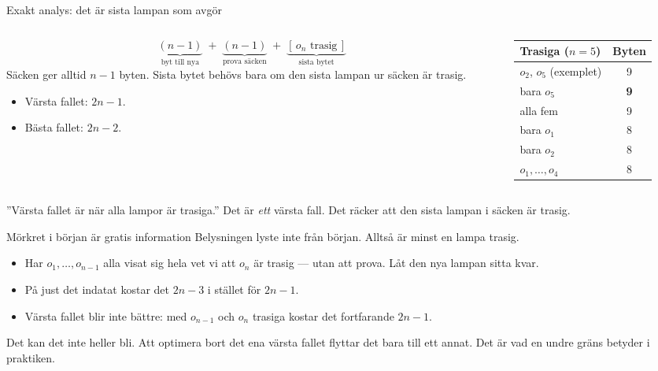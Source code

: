 \begin{frame}{Exakt analys: det är sista lampan som avgör}
\begin{columns}[T]
\begin{column}{0.5\textwidth}
\small
\[
  \underbrace{(n-1)}_{\text{byt till nya}}\;+\;\underbrace{(n-1)}_{\text{prova säcken}}
  \;+\;\underbrace{[\,o_n\text{ trasig}\,]}_{\text{sista bytet}}
\]
Säcken ger alltid $n-1$ byten. Sista bytet behövs bara om den sista lampan ur säcken är trasig.
\begin{itemize}\setlength{\itemsep}{2pt}
  \item Värsta fallet: $2n-1$.
  \item Bästa fallet: $2n-2$.
\end{itemize}
\end{column}
\begin{column}{0.47\textwidth}
\centering
\footnotesize
\renewcommand{\arraystretch}{1.1}
\begin{tabular}{@{}lc@{}}
\toprule
Trasiga ($n=5$) & Byten\\
\midrule
$o_2$, $o_5$ (exemplet) & 9\\
bara $o_5$ & \textbf{9}\\
alla fem & 9\\
bara $o_1$ & 8\\
bara $o_2$ & 8\\
$o_1,\dots,o_4$ & 8\\
\bottomrule
\end{tabular}
\end{column}
\end{columns}
\vfill
\begin{missbox}[fontupper=\footnotesize]
”Värsta fallet är när alla lampor är trasiga.” Det är \emph{ett} värsta fall. Det räcker att den
sista lampan i säcken är trasig.
\end{missbox}
\end{frame}

{\kaninbg
\begin{frame}{\kh Mörkret i början är gratis information}
\small
Belysningen lyste inte från början. Alltså är minst en lampa trasig.
\begin{itemize}\setlength{\itemsep}{3pt}
  \item Har $o_1,\dots,o_{n-1}$ alla visat sig hela vet vi att $o_n$ är trasig — utan att prova.
        Låt den nya lampan sitta kvar.
  \item På just det indatat kostar det $2n-3$ i stället för $2n-1$.
  \item Värsta fallet blir inte bättre: med $o_{n-1}$ och $o_n$ trasiga kostar det fortfarande
        $2n-1$.
\end{itemize}
\vfill
\begin{kaninbox}[fontupper=\footnotesize]
Det kan det inte heller bli. Att optimera bort det ena värsta fallet flyttar det bara till ett annat.
Det är vad en undre gräns betyder i praktiken.
\end{kaninbox}
\end{frame}}


